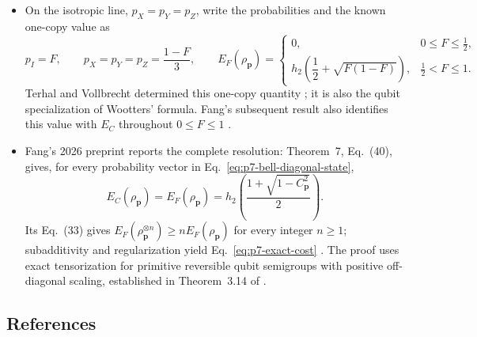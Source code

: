 \begin{itemize}
  \item On the isotropic line,
  $p_X=p_Y=p_Z$, write the probabilities and the known one-copy value as
  \begin{equation}
    p_I=F,
    \qquad p_X=p_Y=p_Z=\frac{1-F}{3},
    \qquad
    E_F(\rho_{\mathbf p})=
    \begin{cases}
      0, & 0\leq F\leq\tfrac12,\\
      h_2\!\left(\dfrac12+\sqrt{F(1-F)}\right),
        & \tfrac12<F\leq1.
    \end{cases}
    \label{eq:p7-isotropic-eof}
  \end{equation}
  Terhal and Vollbrecht determined this one-copy quantity
  ; it is also the qubit
  specialization of Wootters' formula.  Fang's subsequent result also identifies this value with $E_C$
  throughout $0\leq F\leq1$ .

  \item Fang's 2026 preprint reports the complete resolution: Theorem~7,
  Eq.~(40), gives, for every probability vector in Eq.~\eqref{eq:p7-bell-diagonal-state},
  \begin{equation}
    E_C(\rho_{\mathbf p})=E_F(\rho_{\mathbf p})
      =h_2\!\left(\frac{1+\sqrt{1-C_{\mathbf p}^{2}}}{2}\right).
    \label{eq:p7-exact-cost}
  \end{equation}
  Its Eq.~(33) gives
  $E_F(\rho_{\mathbf p}^{\otimes n})\geq nE_F(\rho_{\mathbf p})$
  for every integer $n\geq1$; subadditivity and regularization yield
  Eq.~\eqref{eq:p7-exact-cost} .
  The proof uses exact tensorization for primitive reversible qubit
  semigroups with positive off-diagonal scaling, established in
  Theorem~3.14 of .
\end{itemize}

\subsection*{References}

